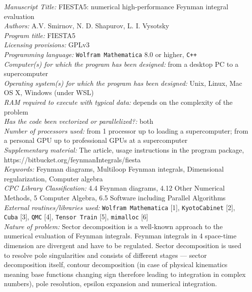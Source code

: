 \documentclass[preprint,12pt]{elsarticle}
\begin{document}
\begin{small}
\noindent
{\em Manuscript Title:} FIESTA5: numerical high-performance Feynman integral evaluation\\
{\em Authors:} A.V. Smirnov, N. D. Shapurov, L. I. Vysotsky\\
{\em Program title:} FIESTA5\\
{\em Licensing provisions:} GPLv3\\
{\em Programming language:} {\tt Wolfram Mathematica} 8.0 or higher, {\tt C++}\\
{\em Computer(s) for which the program has been designed:} from a desktop PC to a supercomputer\\
{\em Operating system(s) for which the program has been designed:} Unix, Linux, Mac OS X, Windows (under WSL)\\
{\em RAM required to execute with typical data:} depends on the complexity of the \\ problem  \\
{\em Has the code been vectorized or parallelized?:} both\\
{\em Number of processors used: } from 1 processor up to loading a supercomputer; from a personal GPU up to professional GPUs at a supercomputer \\
{\em Supplementary material:} The article, usage instructions in the program package, https://bitbucket.org/feynmanIntegrals/fiesta\\
{\em Keywords:} Feynman diagrams, Multiloop Feynman integrals, Dimensional regularization, Computer algebra\\
{\em CPC Library Classification:} 4.4 Feynman diagrams, 4.12  Other Numerical
Methods, 5 Computer Algebra, 6.5 Software including Parallel Algorithms\\
{\em External routines/libraries used:} {\tt Wolfram Mathematica} [1], {\tt KyotoCabinet} [2], {\tt Cuba} [3], {\tt QMC} [4], {\tt Tensor Train} [5], {\tt mimalloc} [6]\\
{\em Nature of problem:}
Sector decomposition is a well-known approach to the numerical evaluation of Feynman integrals.
Feynman integrals in 4 space-time dimension are divergent and have to be regulated. Sector decomposition
is used to resolve pole singularities and consists of different stages --- sector decomposition itself, contour decomposition (in case of physical kinematics meaning base functions changing sign therefore leading to integration in complex numbers), pole resolution, epsilon expansion and numerical integration. 
\\

\end{small}
\end{document}
